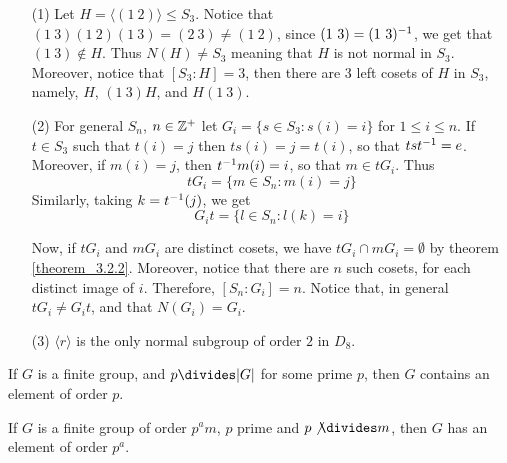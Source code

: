 \begin{example}\label{example_3.6}
  \begin{enumerate}
    \item[(1)] Let $H=\langle (1 \ 2) \rangle \leq S_3$. Notice that $(1 \ 3)(1 \
      2)(1 \ 3)=(2 \ 3) \neq (1 \ 2)$, since $(1 \ 3)=(1 \ 3)^{-1}$, we
      get that $(1 \ 3) \notin H$. Thus $N(H) \neq S_3$ meaning that $H$
      is not normal in $S_3$. Moreover, notice that $[S_3:H]=3$, then
      there are $3$ left cosets of $H$ in $S_3$, namely, $H$,  $(1 \ 3)H$,
      and $H(1 \ 3)$.

    \item[(2)] For general $S_n$,  $n \in \mathbb{Z}^+$ let  $G_i=\{s \in S_3:
      s(i)=i\}$ for $1 \leq i \leq n$. If $t \in S_3$ such that $t(i)=j$
      then $ts(i)=j=t(i)$, so that $tst^{-1}=e$. Moreover, if $m(i)=j$,
      then $t^{-1}m(i)=i$, so that $m \in tG_i$. Thus
      \begin{equation*}
        tG_i=\{m \in S_n : m(i)=j\}
      \end{equation*}
      Similarly, taking $k=t^{-1}(j)$, we get
      \begin{equation*}
        G_it=\{l \in S_n : l(k)=i\}
      \end{equation*}

      Now, if $tG_i$ and  $mG_i$ are distinct cosets, we have  $tG_i \cap
      mG_i = \emptyset$ by theorem \ref{theorem_3.2.2}. Moreover, notice that
      there are $n$ such cosets, for each distinct image of $i$.
      Therefore, $[S_n:G_i]=n$. Notice that, in general $tG_i \neq G_it$,
      and that  $N(G_i)=G_i$.

    \item[(3)] $\langle r \rangle$ is the only normal subgroup of order $2$ in
      $D_8$.
  \end{enumerate}
\end{example}

\begin{theorem}[Cauchy]\label{theorem_3.3.4}
  If $G$ is a finite group, and  $p \divides |G|$ for some prime $p$, then $G$
  contains an element of order  $p$.
\end{theorem}

\begin{theorem}[Sylow]\label{theorem_3.3.5}
  If $G$ is a finite group of order  $p^am$,  $p$ prime and  $p \not{\divides} m$,
  then $G$ has an element of order  $p^a$.
\end{theorem}

